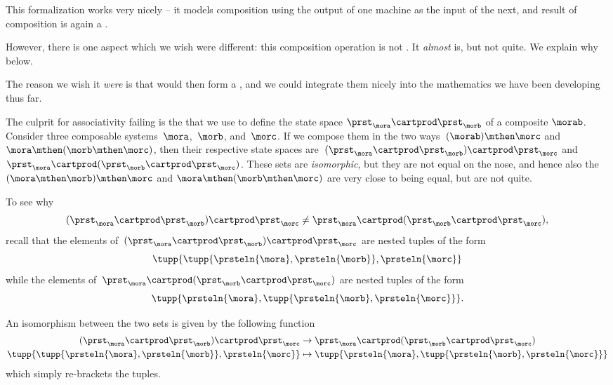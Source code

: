 This formalization works very nicely -- it models composition using the output of one machine as the input of the next, and result of composition is again a .

However, there is one aspect which we wish were different: this composition operation is not .
It \emph{almost} is, but not quite.
We explain why below.

The reason we wish it \emph{were}  is that  would then form a , and we could integrate them nicely into the mathematics we have been developing thus far.

The culprit for associativity failing is the  that we use to define the state space $\prst_{\mora} \cartprod \prst_{\morb}$ of a composite  $\morab$.
Consider three composable systems~$\mora$,~$\morb$, and~$\morc$.
If we compose them in the two ways~$(\morab) \mthen \morc$ and~$\mora \mthen (\morb \mthen \morc)$, then their respective state spaces are~$(\prst_{\mora} \cartprod \prst_{\morb}) \cartprod \prst_{\morc}$ and~$\prst_{\mora} \cartprod (\prst_{\morb} \cartprod \prst_{\morc})$.
These sets are \emph{isomorphic}, but they are not equal on the nose, and hence also the  $(\mora \mthen \morb) \mthen \morc$ and $\mora \mthen (\morb \mthen \morc)$ are very close to being equal, but are not quite.

To see why
\begin{equation}
    \label{eq:assoc-fails1}
    (\prst_{\mora} \cartprod \prst_{\morb}) \cartprod \prst_{\morc} \neq \prst_{\mora} \cartprod (\prst_{\morb} \cartprod \prst_{\morc}),
\end{equation}
recall that the elements of~$(\prst_{\mora} \cartprod \prst_{\morb}) \cartprod \prst_{\morc}$ are nested tuples of the form
\begin{equation}
    \tupp{ \tupp{\prsteln{\mora}, \prsteln{\morb}}, \prsteln{\morc} }
\end{equation}
while the elements of~$\prst_{\mora} \cartprod (\prst_{\morb} \cartprod \prst_{\morc})$ are nested tuples of the form
\begin{equation}
    \tupp{\prsteln{\mora}, \tupp{\prsteln{\morb}, \prsteln{\morc}} }.
\end{equation}

An isomorphism between the two sets is given by the following function
\begin{equation}
    \label{eq:assoc-fails2}
    \begin{aligned}
        (\prst_{\mora} \cartprod \prst_{\morb})
        \cartprod \prst_{\morc}                                           & \to \prst_{\mora} \cartprod (\prst_{\morb} \cartprod \prst_{\morc}) \\
        \tupp{ \tupp{\prsteln{\mora}, \prsteln{\morb}}, \prsteln{\morc} } & \mapsto \tupp{\prsteln{\mora}, \tupp{\prsteln{\morb}, \prsteln{\morc}} }
    \end{aligned}
\end{equation}
which simply re-brackets the tuples.

